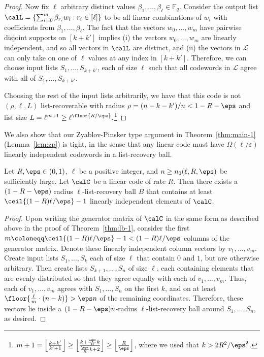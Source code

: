 \documentclass{article}
\begin{document}
\begin{proof}
    Now fix $\ell$ arbitrary distinct values $\beta_1,\dots,\beta_\ell\in\mathbb{F}_q$.
    Consider the output list $\calL = \{\sum_{i=0}^m \beta_{r_i}w_i: r_i\in[\ell]\}$ to be all linear combinations of $w_i$ with coefficients from $\beta_1,\dots,\beta_\ell$.
    The fact that the vectors $w_0,\dots,w_{m}$ have pairwise disjoint supports on $[k+k']$ implies (i) the vectors $w_0,\dots,w_{m}$ are linearly independent, and so all vectors in $\calL$ are distinct, and (ii) the vectors in $\mathcal{L}$ can only take on one of $\ell$ values at any index in $[k+k']$. Therefore, we can choose input lists $S_1,\dots,S_{k+k'}$, each of size $\ell$ such that all codewords in $\mathcal{L}$ agree with all of $S_1,\dots,S_{k+k'}$.

    Choosing the rest of the input lists arbitrarily, we have that this code is not $(\rho, \ell, L)$ list-recoverable with radius $\rho = (n-k-k')/n < 1-R-\eps$ and list size $L=\ell^{m+1} \ge \ell^{\floor{R/\eps}}.$\footnote{$m+1 = \left \lfloor{\frac{k+k'}{k'+1}} \right \rfloor \ge \left \lfloor{\frac{k+\frac{\eps}{R} k}{\frac{\eps}{R} k +2}}\right \rfloor \ge \left \lfloor{\frac{R}{\eps}} \right \rfloor$, where we used that $k>2R^2/\eps^2$.}
    

\end{proof}

We also show that our Zyablov-Pinsker type argument in Theorem~\ref{thm:main-1} (Lemma~\ref{lem:zp}) is tight, in the sense that any linear code must have $\Omega(\ell/\varepsilon)$ linearly independent codewords in a list-recovery ball.

\begin{proposition}
    Let $R,\eps\in(0,1)$, $\ell$ be a positive integer, and $n\ge n_0(\ell,R,\eps)$ be sufficiently large.
    Let $\calC$ be a linear code of rate $R$. Then there exists a $(1-R-\eps)$ radius $\ell$-list-recovery ball $B$ that contains at least $\ceil{(1-R)\ell/\eps}-1$ linearly independent elements of $\calC$.
    \label{pr:lb}
\end{proposition}
\begin{proof}
    Upon writing the generator matrix of $\calC$ in the same form as described above in the proof of Theorem~\ref{thm:lb-1}, consider the first $m \coloneqq \ceil{(1-R)\ell/\eps}-1 < (1-R)\ell/\eps$ columns of the generator matrix.
    Denote these linearly independent column vectors by $v_1,\ldots,v_m$.
    Create input lists $S_1,\dots,S_k$ each of size $\ell$ that contain $0$ and $1$, but are otherwise arbitrary.
    Then create lists $S_{k+1},\dots,S_n$ of size $\ell$, each containing elements that are evenly distributed so that they agree equally with each of $v_1,\dots,v_m$.
    Thus, each of $v_1,\dots,v_m$ agrees with $S_1,\dots,S_n$ on the first $k$, and on at least $\floor{\frac{\ell}{m} \cdot (n-k)} >\eps n$ of the remaining coordinates. Therefore, these vectors lie inside a $(1-R-\eps)n$-radius $\ell$-list-recovery ball around $S_1,\dots,S_n$, as desired.
\end{proof}
\end{document}
